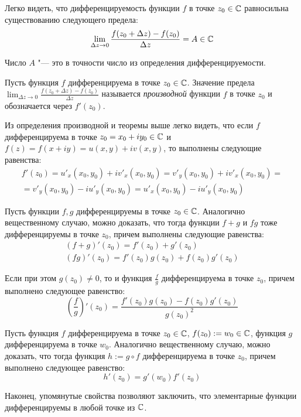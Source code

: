 \begin{note}
	Легко видеть, что дифференцируемость функции $f$ в точке $z_0 \in \mathbb{C}$ равносильна существованию следующего предела:
	\[\lim_{\Delta z \to 0}\frac{f(z_0 + \Delta z) - f(z_0)}{\Delta z} = A \in \mathbb{C}\]
	
	Число $A$ "--- это в точности число из определения дифференцируемости.
\end{note}

\begin{definition}
	Пусть функция $f$ дифференцируема в точке $z_0 \in \mathbb{C}$. Значение предела $\lim_{\Delta z \to 0}\frac{f(z_0 + \Delta z) - f(z_0)}{\Delta z}$ называется \textit{производной} функции $f$ в точке $z_0$ и обозначается через $f'(z_0)$.
\end{definition}

\begin{note}
	Из определения производной и теоремы выше легко видеть, что если $f$ дифференцируема в точке $z_0 = x_0 + iy_0 \in \mathbb{C}$ и $f(z) = f(x + iy) = u(x, y) + iv(x, y)$, то выполнены следующие равенства:
	\begin{multline*}
		f'(z_0) = u'_x(x_0, y_0) + iv'_x(x_0, y_0) = v'_y(x_0, y_0) + iv'_x(x_0, y_0) =
		\\
		= v'_y(x_0, y_0) - iu'_y(x_0, y_0) = u'_x(x_0, y_0) - iu'_y(x_0, y_0)
	\end{multline*}
\end{note}

\begin{note}
	Пусть функции $f, g$ дифференцируемы в точке $z_0 \in \mathbb{C}$. Аналогично вещественному случаю, можно доказать, что тогда функции $f + g$ и $fg$ тоже дифференцируемы в точке $z_0$, причем выполнены следующие равенства:
	\begin{gather*}
		(f + g)'(z_0) = f'(z_0) + g'(z_0)\\
		(fg)'(z_0) = f'(z_0)g(z_0) + f(z_0)g'(z_0)
	\end{gather*}
	
	Если при этом $g(z_0) \ne 0$, то и функция $\frac fg$ дифференцируема в точке $z_0$, причем выполнено следующее равенство:
	\[
	\left(\frac fg\right)'(z_0) = \frac{f'(z_0)g(z_0) - f(z_0)g'(z_0)}{g(z_0)^2}\]
\end{note}

\begin{note}
	Пусть функция $f$ дифференцируема в точке $z_0 \in \mathbb{C}$, $f(z_0) := w_0 \in \mathbb{C}$, функция $g$ дифференцируема в точке $w_0$. Аналогично вещественному случаю, можно доказать, что тогда функция $h := g \circ f$ дифференцируема в точке $z_0$, причем выполнено следующее равенство:
	\[h'(z_0) = g'(w_0)f'(z_0)\]
	
	Наконец, упомянутые свойства позволяют заключить, что элементарные функции дифференцируемы в любой точке из $\mathbb{C}$.
\end{note}

